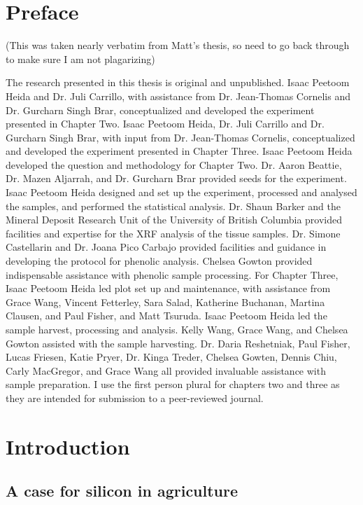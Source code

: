 \documentclass[12pt, letterpaper, ]{report}
\begin{document}
\chapter{Preface}

(This was taken nearly verbatim from Matt's thesis, so need to go back through to make sure I am not plagarizing)

The research presented in this thesis is original and unpublished. Isaac Peetoom Heida and Dr. Juli Carrillo, with assistance from Dr. Jean-Thomas Cornelis and Dr. Gurcharn Singh Brar, conceptualized and developed the experiment presented in Chapter Two. Isaac Peetoom Heida, Dr. Juli Carrillo and Dr. Gurcharn Singh Brar, with input from Dr. Jean-Thomas Cornelis, conceptualized and developed the experiment presented in Chapter Three.
Isaac Peetoom Heida developed the question and methodology for Chapter Two. Dr. Aaron Beattie, Dr. Mazen Aljarrah, and Dr. Gurcharn Brar provided seeds for the experiment. Isaac Peetoom Heida designed and set up the experiment, processed and analysed the samples, and performed the statistical analysis. Dr. Shaun Barker and the Mineral Deposit Research Unit of the University of British Columbia provided facilities and expertise for the XRF analysis of the tissue samples. Dr. Simone Castellarin and Dr. Joana Pico Carbajo provided facilities and guidance in developing the protocol for phenolic analysis. Chelsea Gowton provided indispensable assistance with phenolic sample processing. 
For Chapter Three, Isaac Peetoom Heida led plot set up and maintenance, with assistance from Grace Wang, Vincent Fetterley, Sara Salad, Katherine Buchanan, Martina Clausen, and Paul Fisher, and Matt Tsuruda. Isaac Peetoom Heida led the sample harvest, processing and analysis. Kelly Wang, Grace Wang, and Chelsea Gowton assisted with the sample harvesting. Dr. Daria Reshetniak, Paul Fisher, Lucas Friesen, Katie Pryer, Dr. Kinga Treder, Chelsea Gowten, Dennis Chiu, Carly MacGregor, and Grace Wang all provided invaluable assistance with sample preparation. 
I use the first person plural for chapters two and three as they are intended for submission to a peer-reviewed journal. 

\chapter{Introduction}


\section{A case for silicon in agriculture}
\end{document}

